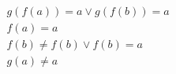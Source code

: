 \begin{align*}
%
& g(f(a)) = a \lor g(f(b)) = a
~\\~
& f(a) = a
~\\~
& f(b)  \neq  f(b) \lor f(b) = a
~\\~
& g(a)  \neq  a
%
\end{align*}
